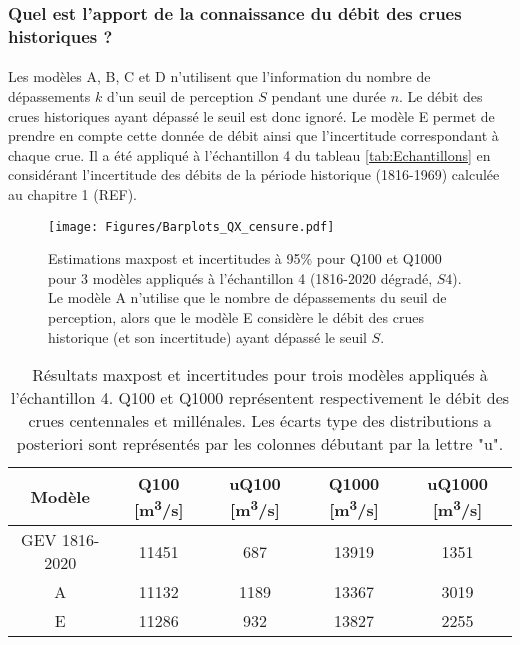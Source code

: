 \documentclass[11pt]{article}
\begin{document}
\FloatBarrier

	\subsubsection{Quel est l'apport de la connaissance du débit des crues historiques ?}

	\paragraph{} Les modèles A, B, C et D n'utilisent que l'information du nombre de dépassements $k$ d'un seuil de perception $S$ pendant une durée $n$. Le débit des crues historiques ayant dépassé le seuil est donc ignoré. Le modèle E permet de prendre en compte cette donnée de débit ainsi que l'incertitude correspondant à chaque crue. Il a été appliqué à l'échantillon 4 du tableau \ref{tab:Echantillons} en considérant l'incertitude des débits de la période historique (1816-1969) calculée au chapitre 1 (REF).
	
	
	\begin{figure}[h]
		\centering
		\texttt{[image: Figures/Barplots\_QX\_censure.pdf]}
		\caption{Estimations maxpost et incertitudes à 95\% pour Q100 et Q1000 pour 3 modèles appliqués à l'échantillon 4 (1816-2020 dégradé, $S4$). Le modèle A n'utilise que le nombre de dépassements du seuil de perception, alors que le modèle E considère le débit des crues historique (et son incertitude) ayant dépassé le seuil $S$.}
		\label{fig:CensureArtif}
	\end{figure}
	
	\begin{table}[h]
		\centering
		\begin{tabular}{|c|c|c|c|c|}
			\hline
			Modèle        & Q100 [m\textsuperscript{3}/s] & uQ100 [m\textsuperscript{3}/s] & Q1000 [m\textsuperscript{3}/s] & uQ1000 [m\textsuperscript{3}/s] \\ \hline
			GEV 1816-2020 & 11451 & 687   & 13919 & 1351   \\ \hline
			A             & 11132 & 1189  & 13367 & 3019   \\ \hline
			E       & 11286 & 932   & 13827 & 2255   \\ \hline
		\end{tabular}%
		\caption{Résultats maxpost et incertitudes pour trois modèles appliqués à l'échantillon 4. Q100 et Q1000 représentent respectivement le débit des crues centennales et millénales. Les écarts type des distributions a posteriori sont représentés par les colonnes débutant par la lettre "u". }
		\label{tab:ResCensure}
	\end{table}
	
\end{document}
